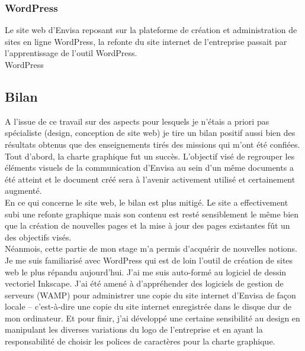 \documentclass[a4paper,12pt,twoside]{article}
\begin{document}
    \subsubsection{WordPress}
    Le site web d'Envisa reposant sur la plateforme de création et administration de sites en ligne \gls{WordPress}, la refonte du site internet de l'entreprise passait par l'apprentissage de l'outil \gls{WordPress}.\\
    \gls{WordPress} 
	\subsection{Bilan}
	A l'issue de ce travail sur des aspects pour lesquels je n'étais a priori pas spécialiste (design, conception de site web) je tire un bilan positif aussi bien des résultats obtenus que des enseignements tirés des missions qui m'ont été confiées.\\
	Tout d'abord, la charte graphique fut un succès. L'objectif visé de regrouper les éléments visuels de la communication d'Envisa au sein d'un même documents a été atteint et le document créé sera à l'avenir activement utilisé et certainement augmenté.\\
	En ce qui concerne le site web, le bilan est plus mitigé. Le site a effectivement subi une refonte graphique mais son contenu est resté sensiblement le même bien que la création de nouvelles pages et la mise à jour des pages existantes fût un des objectifs visés. \\
	Néanmois, cette partie de mon stage m'a permis d'acquérir de nouvelles notions. Je me suis familiarisé avec \gls{WordPress} qui est de loin l'outil de création de sites web le plus répandu aujourd'hui. J'ai me suis auto-formé au logiciel de dessin vectoriel \gls{Inkscape}. J'ai été amené à d'appréhender des logiciels de gestion de serveurs (\gls{WAMP}) pour administrer une copie du site internet d'Envisa de façon locale -- c'est-à-dire une copie du site internet enregistrée dans le disque dur de mon ordinateur. Et pour finir, j'ai développé une certaine sensibilité au design en manipulant les diverses variations du logo de l'entreprise et en ayant la responsabilité de choisir les polices de caractères pour la charte graphique.
\end{document}

